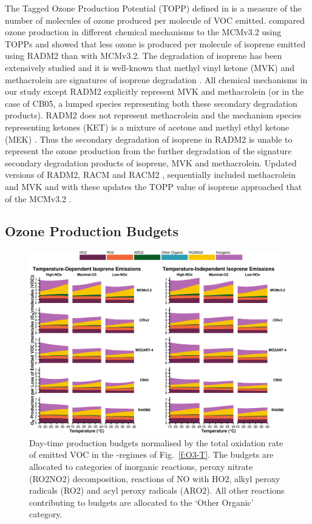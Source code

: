 The Tagged Ozone Production Potential (TOPP) defined in \citet{Butler:2011} is a measure of the number of molecules of ozone produced per molecule of VOC emitted.
\citet{Coates:2015} compared ozone production in different chemical mechanisms to the MCMv3.2 using TOPPs and showed that less ozone is produced per molecule of isoprene emitted using RADM2 than with MCMv3.2.
The degradation of isoprene has been extensively studied and it is well-known that methyl vinyl ketone (MVK) and methacrolein are signatures of isoprene degradation \citep{Atkinson:2000}.
All chemical mechanisms in our study except RADM2 explicitly represent MVK and methacrolein (or in the case of CB05, a lumped species representing both these secondary degradation products).
RADM2 does not represent methacrolein and the mechanism species representing ketones (KET) is a mixture of acetone and methyl ethyl ketone (MEK) \citep{Stockwell:1990}. 
Thus the secondary degradation of isoprene in RADM2 is unable to represent the ozone production from the further degradation of the signature secondary degradation products of isoprene, MVK and methacrolein.
Updated versions of RADM2, RACM \citep{Stockwell:1997} and RACM2 \citep{Goliff:2013}, sequentially included methacrolein and MVK and with these updates the TOPP value of isoprene approached that of the MCMv3.2 \citep{Coates:2015}.

\subsection{Ozone Production Budgets} \label{ss:r_budgets}

\begin{figure}[t]%
    \centering%
    \caption{Day-time  production budgets normalised by the total oxidation rate of emitted VOC in the -regimes of Fig.~\ref{f:O3-T}. The budgets are allocated to categories of inorganic reactions, peroxy nitrate (RO2NO2) decomposition, reactions of NO with HO2, alkyl peroxy radicals (RO2) and acyl peroxy radicals (ARO2). All other reactions contributing to  budgets are allocated to the `Other Organic' category.}%
    \label{f:ozone_budgets}%
    \includegraphics[width=\textwidth]{img/Ox_budgets}
\end{figure}

